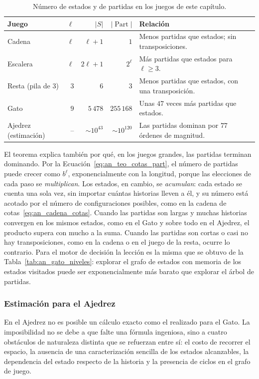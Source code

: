 \begin{table}[htbp]
\centering
\small
\caption{Número de estados y de partidas en los juegos de este capítulo.}
\label{tab:an_partidas_vs_estados}
\begin{tabularx}{\textwidth}{@{}l r r r Y@{}}
\toprule
\textbf{Juego} & $\ell$ & $|S|$ & $|\operatorname{Part}|$ & \textbf{Relación} \\
\midrule
Cadena & $\ell$ & $\ell + 1$ & $1$ & Menos partidas que estados; sin transposiciones. \\
Escalera & $\ell$ & $2\ell + 1$ & $2^{\ell}$ & Más partidas que estados para $\ell \ge 3$. \\
Resta (pila de $3$) & $3$ & $6$ & $3$ & Menos partidas que estados, con una transposición. \\
Gato & $9$ & $5\,478$ & $255\,168$ & Unas $47$ veces más partidas que estados. \\
Ajedrez (estimación) & -- & $\sim 10^{43}$ & $\sim 10^{120}$ & Las partidas dominan por $77$ órdenes de magnitud. \\
\bottomrule
\end{tabularx}
\end{table}

El teorema explica también por qué, en los juegos grandes, las partidas terminan dominando. Por la Ecuación~\eqref{eq:an_teo_cotas_part}, el número de partidas puede crecer como $b^{\ell}$, exponencialmente con la longitud, porque las elecciones de cada paso se \emph{multiplican}. Los estados, en cambio, se \emph{acumulan}: cada estado se cuenta una sola vez, sin importar cuántas historias lleven a él, y su número está acotado por el número de configuraciones posibles, como en la cadena de cotas~\eqref{eq:an_cadena_cotas}. Cuando las partidas son largas y muchas historias convergen en los mismos estados, como en el Gato y sobre todo en el Ajedrez, el producto supera con mucho a la suma. Cuando las partidas son cortas o casi no hay transposiciones, como en la cadena o en el juego de la resta, ocurre lo contrario. Para el motor de decisión la lección es la misma que se obtuvo de la Tabla~\ref{tab:an_gato_niveles}: explorar el grafo de estados con memoria de los estados visitados puede ser exponencialmente más barato que explorar el árbol de partidas.

\subsubsection{Estimación para el Ajedrez}

En el Ajedrez no es posible un cálculo exacto como el realizado para el Gato. La imposibilidad no se debe a que falte una fórmula ingeniosa, sino a cuatro obstáculos de naturaleza distinta que se refuerzan entre sí: el costo de recorrer el espacio, la ausencia de una caracterización sencilla de los estados alcanzables, la dependencia del estado respecto de la historia y la presencia de ciclos en el grafo de juego.

